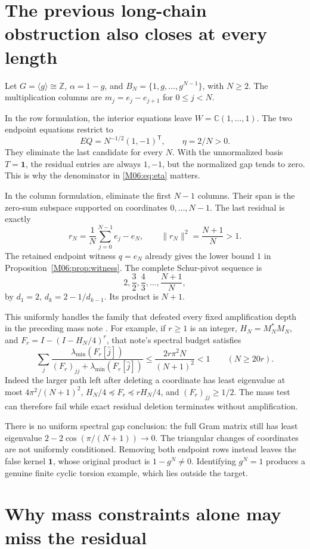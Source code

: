 \documentclass[11pt,a4paper,oneside]{report}
\theoremstyle{definition}
\theoremstyle{remark}
\newcommand{\C}{\mathbb C}
\newcommand{\Z}{\mathbb Z}
\newcommand{\one}{\mathbf 1}
\begin{document}
\section{The previous long-chain obstruction also closes at every length}

Let $G=\langle g\rangle\cong\Z$, $\alpha=1-g$, and
$B_N=\{1,g,\ldots,g^{N-1}\}$, with $N\ge2$.
The multiplication columns are
$m_j=e_j-e_{j+1}$ for $0\le j<N$.

In the row formulation, the interior equations leave
$W=\C(1,\ldots,1)$. The two endpoint equations restrict to
\[
EQ=N^{-1/2}(1,-1)^{\mathsf T},\qquad \eta=2/N>0.
\]
They eliminate the last candidate for every $N$.
With the unnormalized basis $T=\one$, the residual entries are
always $1,-1$, but the normalized gap tends to zero. This is
why the denominator in \eqref{M06:eq:eta} matters.

In the column formulation, eliminate the first $N-1$ columns.
Their span is the zero-sum subspace supported on coordinates
$0,\ldots,N-1$. The last residual is exactly
\[
r_N=\frac1N\sum_{j=0}^{N-1}e_j-e_N,\qquad
\boxed{\|r_N\|^2=\frac{N+1}{N}>1.}
\]
The retained endpoint witness $q=e_N$ already gives the lower
bound $1$ in Proposition~\ref{M06:prop:witness}. The complete
Schur-pivot sequence is
\[
2,\frac32,\frac43,\ldots,\frac{N+1}{N},
\]
by $d_1=2$, $d_k=2-1/d_{k-1}$. Its product is $N+1$.

This uniformly handles the family that defeated every fixed
amplification depth in the preceding mass note \cite{B:InternalMass}.
For example, if $r\ge1$ is an integer, $H_N=M_N^*M_N$, and
$F_r=I-(I-H_N/4)^r$, that note's spectral budget satisfies
\[
\sum_j\frac{\lambda_{\min}(F_r[\widehat j])}
{(F_r)_{jj}+\lambda_{\min}(F_r[\widehat j])}
\le\frac{2r\pi^2N}{(N+1)^2}<1\qquad(N\ge20r).
\]
Indeed the larger path left after deleting a coordinate has
least eigenvalue at most $4\pi^2/(N+1)^2$,
$H_N/4\preceq F_r\preceq rH_N/4$, and $(F_r)_{jj}\ge1/2$.
The mass test can therefore fail while exact residual deletion
terminates without amplification.

There is no uniform spectral gap conclusion: the full Gram
matrix still has least eigenvalue
$2-2\cos(\pi/(N+1))\to0$. The triangular changes of coordinates
are not uniformly conditioned. Removing both endpoint rows
instead leaves the false kernel $\one$, whose original product
is $1-g^N\ne0$. Identifying $g^N=1$ produces a genuine finite
cyclic torsion example, which lies outside the target.

\section{Why mass constraints alone may miss the residual}
\end{document}

